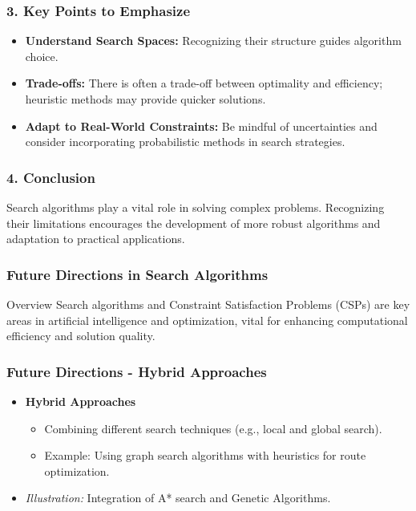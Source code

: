 \documentclass[aspectratio=169]{beamer}
\begin{document}
\begin{frame}[fragile]
    \frametitle{3. Key Points to Emphasize}
    \begin{itemize}
        \item \textbf{Understand Search Spaces:} Recognizing their structure guides algorithm choice.
        \item \textbf{Trade-offs:} There is often a trade-off between optimality and efficiency; heuristic methods may provide quicker solutions.
        \item \textbf{Adapt to Real-World Constraints:} Be mindful of uncertainties and consider incorporating probabilistic methods in search strategies.
    \end{itemize}
\end{frame}

\begin{frame}[fragile]
    \frametitle{4. Conclusion}
    Search algorithms play a vital role in solving complex problems. Recognizing their limitations encourages the development of more robust algorithms and adaptation to practical applications.
\end{frame}

\begin{frame}[fragile]
    \frametitle{Future Directions in Search Algorithms}
    \begin{block}{Overview}
        Search algorithms and Constraint Satisfaction Problems (CSPs) are key areas in artificial intelligence and optimization, vital for enhancing computational efficiency and solution quality.
    \end{block}
\end{frame}

\begin{frame}[fragile]
    \frametitle{Future Directions - Hybrid Approaches}
    \begin{itemize}
        \item \textbf{Hybrid Approaches}
            \begin{itemize}
                \item Combining different search techniques (e.g., local and global search).
                \item Example: Using graph search algorithms with heuristics for route optimization.
            \end{itemize}
        \item \textit{Illustration:} Integration of A* search and Genetic Algorithms.
    \end{itemize}
\end{frame}
\end{document}
